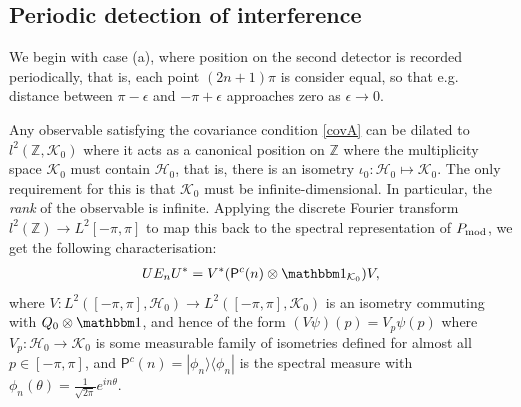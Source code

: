 \subsection{Periodic detection of interference}

We begin with case (a), where position on the second detector is recorded periodically, that is, each point $(2n+1)\pi$ is consider equal, so that e.g. distance between $\pi-\epsilon$ and $-\pi+\epsilon$ approaches zero as $\epsilon\rightarrow 0$.

Any observable satisfying the covariance condition \eqref{covA} can be dilated to $l^2(\mathbb Z, \mathcal K_0)$ where it acts as a canonical position on $\mathbb Z$ \cite{WERNER1990166} where the multiplicity space $\mathcal K_0$ must contain $\mathcal H_0$, that is, there is an isometry $\iota_0:\mathcal H_0\mapsto \mathcal K_0$. The only requirement for this is that $\mathcal K_0$ must be infinite-dimensional. In particular, the \emph{rank} of the observable is infinite. Applying the discrete Fourier transform $l^2(\mathbb Z)\to L^2[-\pi,\pi]$ to map this back to the spectral representation of $P_{\mathrm{mod}}$, we get the following characterisation:
\newcommand{\Pc}{\mathsf P^c}
\newcommand{\Qd}{Q_d}
\begin{align}
UE_nU^* = V^* (\Pc(n)\otimes \id_{\mathcal K_0})V,
\end{align}
where $V:L^2([-\pi,\pi],\mathcal H_0)\to L^2([-\pi,\pi],\mathcal K_0)$ is an isometry commuting with $Q_0\otimes \id$, and hence of the form $(V\psi)(p) = V_p\psi(p)$ where $V_p:\mathcal H_0\to \mathcal K_0$ is some measurable family of isometries defined for almost all $p\in [-\pi,\pi]$, and $\Pc(n)=|\phi_n\rangle\langle \phi_n|$ is the spectral measure with $\phi_n(\theta) = \frac {1}{\sqrt{2\pi}} e^{in\theta}$.

